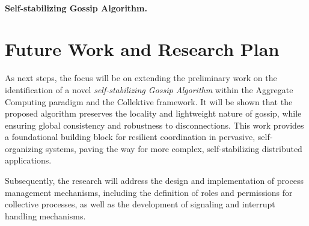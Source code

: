 \documentclass[runningheads]{llncs}
\begin{document}
    \paragraph{Self-stabilizing Gossip Algorithm.}



    \section{Future Work and Research Plan}\label{sec:future}

    As next steps,
    the focus will be on extending the preliminary work on the identification of a novel \emph{self-stabilizing Gossip Algorithm}
    within the Aggregate Computing paradigm and the Collektive framework.
%
    It will be shown that the proposed algorithm preserves the locality and lightweight nature of gossip,
    while ensuring global consistency and robustness to disconnections.
%
    This work provides a foundational building block for resilient coordination in pervasive,
    self-organizing systems, paving the way for more complex, self-stabilizing distributed applications.

    Subsequently,
    the research will address the design and implementation of process management mechanisms,
    including the definition of roles and permissions for collective processes,
    as well as the development of signaling and interrupt handling mechanisms.
\end{document}
